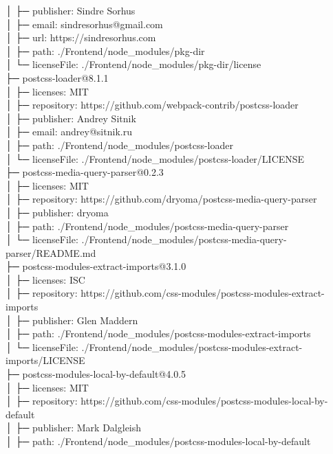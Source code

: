 \documentclass[
    paper=a4,
    twoside=false,
    parskip=half,
    listof=entryprefix,
    listof=totoc,
    index=totoc,
    bibliography=totoc,
    headsepline,
]{scrbook}
\begin{document}
    │  ├─ publisher: Sindre Sorhus\\
    │  ├─ email: sindresorhus@gmail.com\\
    │  ├─ url: https://sindresorhus.com\\
    │  ├─ path: ./Frontend/node\_modules/pkg-dir\\
    │  └─ licenseFile: ./Frontend/node\_modules/pkg-dir/license\\
    ├─ postcss-loader@8.1.1\\
    │  ├─ licenses: MIT\\
    │  ├─ repository: https://github.com/webpack-contrib/postcss-loader\\
    │  ├─ publisher: Andrey Sitnik\\
    │  ├─ email: andrey@sitnik.ru\\
    │  ├─ path: ./Frontend/node\_modules/postcss-loader\\
    │  └─ licenseFile: ./Frontend/node\_modules/postcss-loader/LICENSE\\
    ├─ postcss-media-query-parser@0.2.3\\
    │  ├─ licenses: MIT\\
    │  ├─ repository: https://github.com/dryoma/postcss-media-query-parser\\
    │  ├─ publisher: dryoma\\
    │  ├─ path: ./Frontend/node\_modules/postcss-media-query-parser\\
    │  └─ licenseFile: ./Frontend/node\_modules/postcss-media-query-parser/README.md\\
    ├─ postcss-modules-extract-imports@3.1.0\\
    │  ├─ licenses: ISC\\
    │  ├─ repository: https://github.com/css-modules/postcss-modules-extract-imports\\
    │  ├─ publisher: Glen Maddern\\
    │  ├─ path: ./Frontend/node\_modules/postcss-modules-extract-imports\\
    │  └─ licenseFile: ./Frontend/node\_modules/postcss-modules-extract-imports/LICENSE\\
    ├─ postcss-modules-local-by-default@4.0.5\\
    │  ├─ licenses: MIT\\
    │  ├─ repository: https://github.com/css-modules/postcss-modules-local-by-default\\
    │  ├─ publisher: Mark Dalgleish\\
    │  ├─ path: ./Frontend/node\_modules/postcss-modules-local-by-default\\
\end{document}
